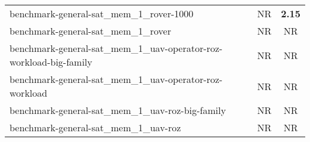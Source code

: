 \begin{tabular}{lcc}
benchmark-general-sat\_mem\_1\_rover-1000 & NR & \textbf{2.15} \\
benchmark-general-sat\_mem\_1\_rover & NR & NR \\
benchmark-general-sat\_mem\_1\_uav-operator-roz-workload-big-family & NR & NR \\
benchmark-general-sat\_mem\_1\_uav-operator-roz-workload & NR & NR \\
benchmark-general-sat\_mem\_1\_uav-roz-big-family & NR & NR \\
benchmark-general-sat\_mem\_1\_uav-roz & NR & NR \\
\bottomrule
\end{tabular}
